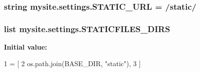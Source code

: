 \subsubsection[{\texorpdfstring{S\+T\+A\+T\+I\+C\+\_\+\+U\+RL}{STATIC_URL}}]{\setlength{\rightskip}{0pt plus 5cm}string mysite.\+settings.\+S\+T\+A\+T\+I\+C\+\_\+\+U\+RL = \textquotesingle{}/static/\textquotesingle{}}\hypertarget{namespacemysite_1_1settings_a2aa5b2f0ed54dd3f8965ca2786f7fc27}{}\label{namespacemysite_1_1settings_a2aa5b2f0ed54dd3f8965ca2786f7fc27}
\subsubsection[{\texorpdfstring{S\+T\+A\+T\+I\+C\+F\+I\+L\+E\+S\+\_\+\+D\+I\+RS}{STATICFILES_DIRS}}]{\setlength{\rightskip}{0pt plus 5cm}list mysite.\+settings.\+S\+T\+A\+T\+I\+C\+F\+I\+L\+E\+S\+\_\+\+D\+I\+RS}\hypertarget{namespacemysite_1_1settings_a205e94f007acd02d712fdf82cb1ea978}{}\label{namespacemysite_1_1settings_a205e94f007acd02d712fdf82cb1ea978}
{\bfseries Initial value\+:}
\begin{DoxyCode}
1 = [
2 os.path.join(BASE\_DIR, \textcolor{stringliteral}{"static"}),
3 ]
\end{DoxyCode}
